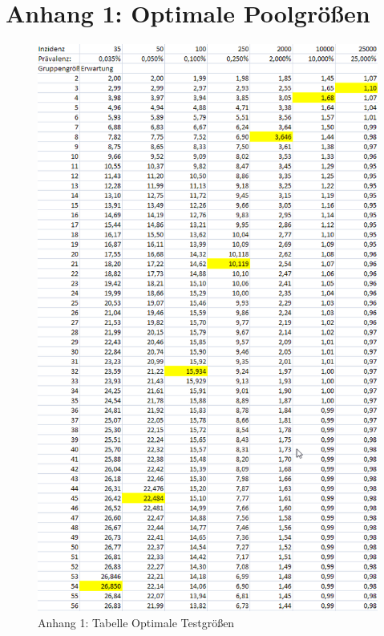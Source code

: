\chapter*{Anhang 1: Optimale Poolgrößen}
\begin{figure}[h]
	\centering
	\includegraphics[width=.63\textwidth]{img/TabelleOptimum}
	\caption*{Anhang 1: Tabelle Optimale Testgrößen\footnotemark}
\end{figure}
